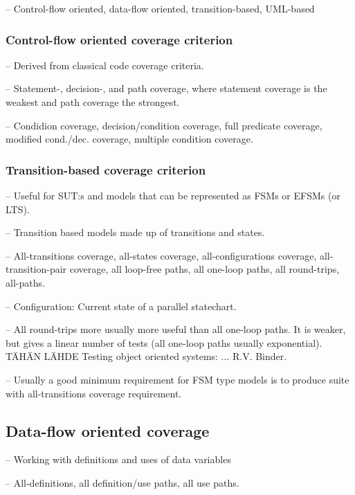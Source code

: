 -- Control-flow oriented, data-flow oriented, transition-based, UML-based

\subsubsection{Control-flow oriented coverage criterion}
--  Derived from classical code coverage criteria.

-- Statement-, decision-, and path coverage, where statement coverage is the weakest and path coverage the strongest.

-- Condidion coverage, decision/condition coverage, full predicate coverage, modified cond./dec. coverage, multiple condition coverage.

\subsubsection{Transition-based coverage criterion}
-- Useful for SUT:s and models that can be represented as FSMs or EFSMs (or LTS).

-- Transition based models made up of transitions and states.

-- All-transitions coverage, all-states coverage, all-configurations coverage, all-transition-pair coverage, all loop-free paths, all one-loop paths, all round-trips, all-paths.

-- Configuration: Current state of a parallel statechart.

-- All round-trips more usually more useful than all one-loop paths. It is weaker, but gives a linear number of tests (all one-loop paths usually exponential). TÄHÄN LÄHDE Testing object oriented systems: ... R.V. Binder.

-- Usually a good minimum requirement for FSM type models is to produce suite with all-transitions coverage requirement.

\subsection{Data-flow oriented coverage}
-- Working with definitions and uses of data variables

-- All-definitions, all definition/use paths, all use paths.